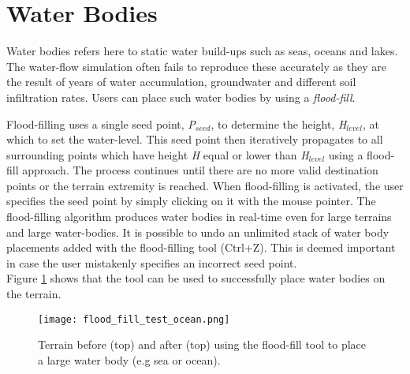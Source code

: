 \section{Water Bodies} \label{sec:water_bodies}

Water bodies refers here to static water build-ups such as seas, oceans and lakes. The water-flow simulation \label{sec:rivers_and_streams} often fails to reproduce these accurately as they are the result of years of water accumulation, groundwater and different soil infiltration rates. Users can place such water bodies by using a \textit{flood-fill}.

Flood-filling uses a single seed point, \textit{P$_{seed}$}, to determine the height, \textit{H$_{level}$}, at which to set the water-level. This seed point then iteratively propagates to all surrounding points which have height \textit{H} equal or lower than \textit{H$_{level}$} using a flood-fill approach. The process continues until there are no more valid destination points or the terrain extremity is reached. When flood-filling is activated, the user specifies the seed point by simply clicking on it with the mouse pointer. The flood-filling algorithm produces water bodies in real-time even for large terrains and large water-bodies. It is possible to undo an unlimited stack of water body placements added with the flood-filling tool (Ctrl+Z). This is deemed important in case the user mistakenly specifies an incorrect seed point. \\

Figure \ref{fig:flood_fill_test} shows that the tool can be used to successfully place water bodies on the terrain.

\begin{figure}
\center
	\texttt{[image: flood\_fill\_test\_ocean.png]}
	\caption{ Terrain before (top) and after (top) using the flood-fill tool to place a large water body (e.g sea or ocean). }	
	\label{fig:flood_fill_test}
\end{figure}
